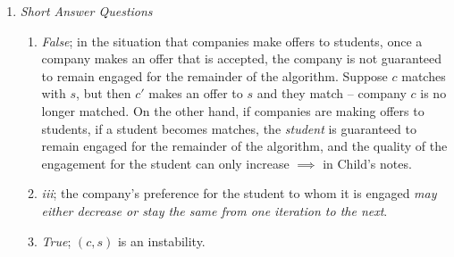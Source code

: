 \documentclass[12pt]{scrartcl}
\begin{document}
\begin{enumerate}
\item \textit{Short Answer Questions}

\begin{enumerate}
\item \textit{False}; in the situation that companies make offers to students, once a company makes an offer that is accepted, 
the company is not guaranteed to remain engaged for the remainder of the algorithm. Suppose $c$ matches with $s$, but then $c'$ makes an offer 
to $s$ and they match -- company $c$ is no longer matched. On the other hand, if companies are making offers to students, 
if a student becomes matches, the \textit{student} is guaranteed to remain engaged for the remainder of the algorithm, and 
the quality of the engagement for the student can only increase $\implies$  in Child's notes.

\item \textit{iii}; the company's preference for the student to whom it is engaged \textit{may either decrease or stay the same from one iteration to the next}.

\item \textit{True}; $(c, s)$ is an instability.


\end{enumerate}
\end{enumerate}
\end{document}
